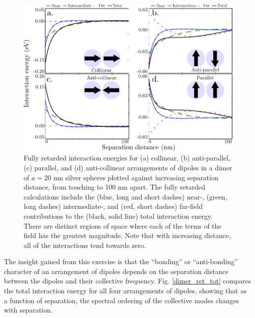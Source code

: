 \documentclass [11pt, proquest] {uwthesis}[2016/11/22]
\begin{document}
\begin{figure}
\begin{centering}
\includegraphics{dimer_ret.pdf}
\caption{Fully retarded interaction energies for (a) collinear, (b) anti-parallel, (c) parallel, and (d) anti-collinear arrangements of dipoles in a dimer of $a=20$ nm silver spheres plotted against increasing separation distance, from touching to 100 nm apart. The fully retarded calculations include the (blue, long and short dashes) near-, (green, long dashes) intermediate-, and (red, short dashes) far-field contributions to the (black, solid line) total interaction energy. There are distinct regions of space where each of the terms of the field has the greatest magnitude. Note that with increasing distance, all of the interactions tend towards zero.}
\label{dimer_ret}
\end{centering}
\end{figure}

The insight gained from this exercise is that the ``bonding'' or ``anti-bonding'' character of an arrangement of dipoles depends on the separation distance between the dipoles and their collective frequency. Fig. \ref{dimer_ret_tot} compares the total interaction energy for all four arrangements of dipoles, showing that as a function of separation, the spectral ordering of the collective modes changes with separation.
\end{document}
